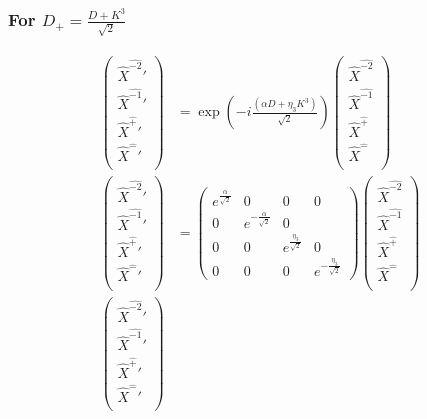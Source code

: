 \documentclass[]{article}
\numberwithin{equation}{section}
\begin{document}
{{\subsubsection{For $D_{+}=\frac{D+K^3}{\sqrt{2}}$}
\begin{align}
\begin{pmatrix}
    \hat{X}^{\hat{-2}}'\\
    \hat{X}^{\hat{-1}}'\\
    \hat{X}^{\hat{+}}'\\
    \hat{X}^{\hat{-}}'\\
    \end{pmatrix}&= \exp{\left(-i\frac{(\alpha D+\eta_{3}K^{3})}{\sqrt{2}}\right)}\begin{pmatrix}
    \hat{X}^{\hat{-2}}\\
    \hat{X}^{\hat{-1}}\\
    \hat{X}^{\hat{+}}\\
    \hat{X}^{\hat{-}}\\
    \end{pmatrix}\\
    \begin{pmatrix}
    \hat{X}^{\hat{-2}}'\\
    \hat{X}^{\hat{-1}}'\\
    \hat{X}^{\hat{+}}'\\
    \hat{X}^{\hat{-}}'\\
    \end{pmatrix}&= \begin{pmatrix}
        e^{\frac{\alpha}{\sqrt{2}}}&0&0&0\\
        0&e^{-\frac{\alpha}{\sqrt{2}}}&0&\\
        0&0&e^{\frac{\eta_{3}}{\sqrt{2}}}&0\\
        0&0&0&e^{-\frac{\eta_{3}}{\sqrt{2}}}
    \end{pmatrix}\begin{pmatrix}
    \hat{X}^{\hat{-2}}\\
    \hat{X}^{\hat{-1}}\\
    \hat{X}^{\hat{+}}\\
    \hat{X}^{\hat{-}}\\
    \end{pmatrix}\\
    \begin{pmatrix}
    \hat{X}^{\hat{-2}}'\\
    \hat{X}^{\hat{-1}}'\\
    \hat{X}^{\hat{+}}'\\
    \hat{X}^{\hat{-}}'\\

\end{pmatrix}
\end{align}}}
\end{document}
